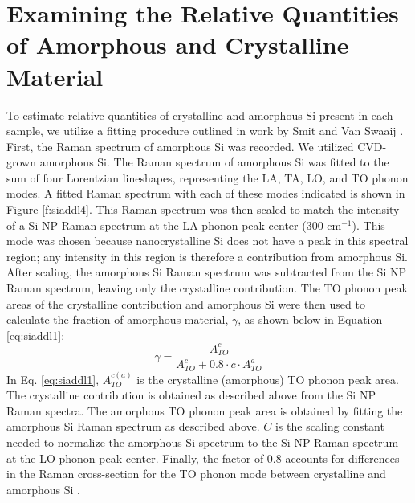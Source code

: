 \section{Examining the Relative Quantities of Amorphous and Crystalline Material}
To estimate relative quantities of crystalline and amorphous Si present in each sample, we utilize a fitting procedure outlined in work by Smit and Van Swaaij \cite{smit2003determining}. First, the Raman spectrum of amorphous Si was recorded. We utilized CVD-grown amorphous Si. The Raman spectrum of amorphous Si was fitted to the sum of four Lorentzian lineshapes, representing the LA, TA, LO, and TO phonon modes. A fitted Raman spectrum with each of these modes indicated is shown in Figure \ref{f:siaddl4}. This Raman spectrum was then scaled to match the intensity of a Si NP Raman spectrum at the LA phonon peak center (300 cm$^{-1}$). This mode was chosen because nanocrystalline Si does not have a peak in this spectral region; any intensity in this region is therefore a contribution from amorphous Si. After scaling, the amorphous Si Raman spectrum was subtracted from the Si NP Raman spectrum, leaving only the crystalline contribution. The TO phonon peak areas of the crystalline contribution and amorphous Si were then used to calculate the fraction of amorphous material, $\gamma$, as shown below in Equation \ref{eq:siaddl1}:
\begin{equation}\label{eq:siaddl1}
\gamma = \frac{A_{TO}^{c}}{A_{TO}^{c} + 0.8 \cdot c \cdot A_{TO}^{a}}
\end{equation}
In Eq. \ref{eq:siaddl1}, $A_{TO}^{c\left(a\right)}$ is the crystalline (amorphous) TO phonon peak area. The crystalline contribution is obtained as described above from the Si NP Raman spectra. The amorphous TO phonon peak area is obtained by fitting the amorphous Si Raman spectrum as described above. $C$ is the scaling constant needed to normalize the amorphous Si spectrum to the Si NP Raman spectrum at the LO phonon peak center. Finally, the factor of 0.8 accounts for differences in the Raman cross-section for the TO phonon mode between crystalline and amorphous Si \cite{smit2003determining}.

